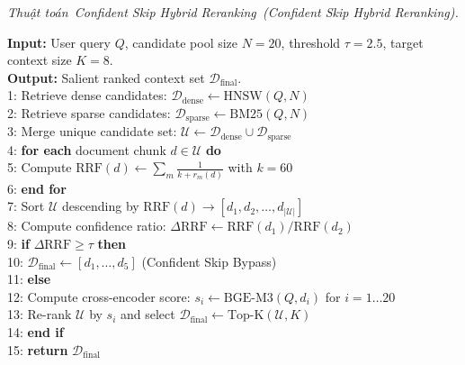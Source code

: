 \documentclass[10pt]{SPIIRAS_Proceedings}
\renewenvironment{algorithm}[1][\unskip]{%
  \refstepcounter{alg}%
  \vskip 6pt\noindent%
  {\slshape Thuật toán~\thealg\ifx\relax#1\relax\else\ (#1)\fi.}%
  \par\nopagebreak\smallskip\upshape
}{\par\vskip 6pt}
\begin{document}
\begin{minipage}{\linewidth}
\begin{algorithm}[Confident Skip Hybrid Reranking]\label{alg:confident_skip}
\textbf{Input:} User query $Q$, candidate pool size $N=20$, threshold $\tau=2.5$, target context size $K=8$.\\
\textbf{Output:} Salient ranked context set $\mathcal{D}_{\text{final}}$.\\
1: Retrieve dense candidates: $\mathcal{D}_{\text{dense}} \leftarrow \text{HNSW}(Q, N)$\\
2: Retrieve sparse candidates: $\mathcal{D}_{\text{sparse}} \leftarrow \text{BM25}(Q, N)$\\
3: Merge unique candidate set: $\mathcal{U} \leftarrow \mathcal{D}_{\text{dense}} \cup \mathcal{D}_{\text{sparse}}$\\
4: \textbf{for each} document chunk $d \in \mathcal{U}$ \textbf{do}\\
5: \quad Compute $\text{RRF}(d) \leftarrow \sum_{m} \frac{1}{k + r_m(d)}$ with $k=60$\\
6: \textbf{end for}\\
7: Sort $\mathcal{U}$ descending by $\text{RRF}(d) \rightarrow [d_1, d_2, \dots, d_{|\mathcal{U}|}]$\\
8: Compute confidence ratio: $\Delta \text{RRF} \leftarrow \text{RRF}(d_1) / \text{RRF}(d_2)$\\
9: \textbf{if} $\Delta \text{RRF} \ge \tau$ \textbf{then}\\
10: \quad $\mathcal{D}_{\text{final}} \leftarrow [d_1, \dots, d_5]$ \quad (Confident Skip Bypass)\\
11: \textbf{else}\\
12: \quad Compute cross-encoder score: $s_i \leftarrow \text{BGE-M3}(Q, d_i)$ for $i=1 \dots 20$\\
13: \quad Re-rank $\mathcal{U}$ by $s_i$ and select $\mathcal{D}_{\text{final}} \leftarrow \text{Top-K}(\mathcal{U}, K)$\\
14: \textbf{end if}\\
15: \textbf{return} $\mathcal{D}_{\text{final}}$
\end{algorithm}
\end{minipage}
\end{document}
